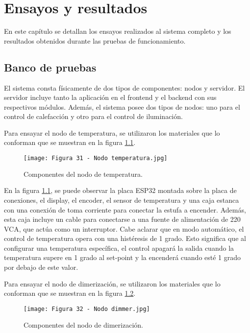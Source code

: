 \chapter{Ensayos y resultados}

\label{Chapter4}

En este capítulo se detallan los ensayos realizados al sistema completo y los resultados obtenidos durante las pruebas de funcionamiento.

\section{Banco de pruebas}

El sistema consta físicamente de dos tipos de componentes: nodos y servidor. El servidor incluye tanto la aplicación en el frontend y el backend con sus respectivos módulos. Además, el sistema posee dos tipos de nodos: uno para el control de calefacción y otro para el control de iluminación.

Para ensayar el nodo de temperatura, se utilizaron los materiales que lo conforman que se muestran en la figura \ref{fig:31}.

\begin{figure}[h]
\centering
\texttt{[image: Figura 31 - Nodo temperatura.jpg]}
\caption[Nodo temperatura]{Componentes del nodo de temperatura.}
\label{fig:31}
\end{figure}

En la figura \ref{fig:31}, se puede observar la placa ESP32 montada sobre la placa de conexiones, el display, el encoder, el sensor de temperatura y una caja estanca con una conexión de toma corriente para conectar la estufa a encender. Además, esta caja incluye un cable para conectarse a una fuente de alimentación de 220 VCA, que actúa como un interruptor. Cabe aclarar que en modo automático, el control de temperatura opera con una histéresis de 1 grado. Esto significa que al configurar una temperatura específica, el control apagará la salida cuando la temperatura supere en 1 grado al set-point y la encenderá cuando esté 1 grado por debajo de este valor.

Para ensayar el nodo de dimerización, se utilizaron los materiales que lo conforman que se muestran en la figura \ref{fig:32}.

\begin{figure}[h]
\centering
\texttt{[image: Figura 32 - Nodo dimmer.jpg]}
\caption[Nodo dimmer]{Componentes del nodo de dimerización.}
\label{fig:32}
\end{figure}

